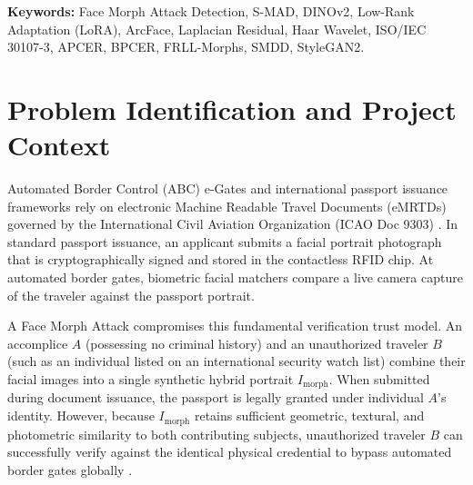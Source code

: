 \documentclass[11pt,a4paper]{article}
\begin{document}
\textbf{Keywords:} Face Morph Attack Detection, S-MAD, DINOv2, Low-Rank Adaptation (LoRA), ArcFace, Laplacian Residual, Haar Wavelet, ISO/IEC 30107-3, APCER, BPCER, FRLL-Morphs, SMDD, StyleGAN2.

\vspace{8pt}

\section{Problem Identification and Project Context}
\label{sec:intro}

Automated Border Control (ABC) e-Gates and international passport issuance frameworks rely on electronic Machine Readable Travel Documents (eMRTDs) governed by the International Civil Aviation Organization (ICAO Doc 9303) \cite{icao9303}. In standard passport issuance, an applicant submits a facial portrait photograph that is cryptographically signed and stored in the contactless RFID chip. At automated border gates, biometric facial matchers compare a live camera capture of the traveler against the passport portrait.

A Face Morph Attack compromises this fundamental verification trust model. An accomplice $A$ (possessing no criminal history) and an unauthorized traveler $B$ (such as an individual listed on an international security watch list) combine their facial images into a single synthetic hybrid portrait $I_{\text{morph}}$. When submitted during document issuance, the passport is legally granted under individual $A$'s identity. However, because $I_{\text{morph}}$ retains sufficient geometric, textural, and photometric similarity to both contributing subjects, unauthorized traveler $B$ can successfully verify against the identical physical credential to bypass automated border gates globally \cite{scherhag2019face, ferrara2021morphing, venkatesh2021face}.
\end{document}
